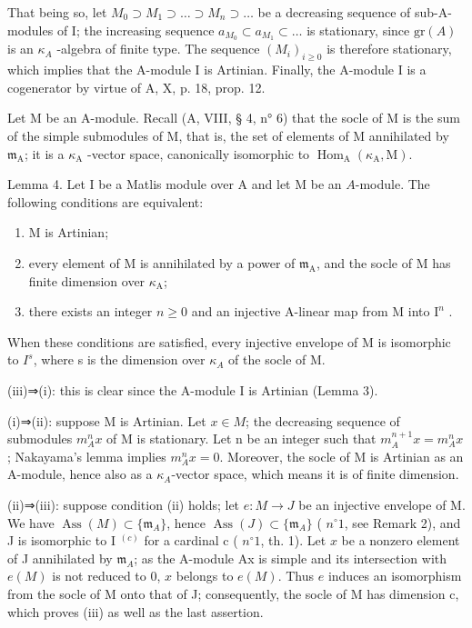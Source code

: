 That being so, let \(M_{0} \supset M_{1} \supset \ldots \supset M_{n} \supset \ldots\) be a decreasing sequence of sub-A-modules of I; the increasing sequence \(a_{M_{0}} \subset a_{M_{1}} \subset \ldots\) is stationary, since \(\text{gr}(A)\) is an \(\kappa_{A}\) -algebra of finite type. The sequence \((M_{i})_{i \geqslant 0}\) is therefore stationary, which implies that the A-module I is Artinian. Finally, the A-module I is a cogenerator by virtue of A, X, p. 18, prop. 12.

Let M be an A-module. Recall (A, VIII, § 4, n° 6) that the socle of M is the sum of the simple submodules of M, that is, the set of elements of M annihilated by \(\mathfrak{m}_{\mathrm{A}}\); it is a \(\kappa_{\mathrm{A}}\) -vector space, canonically isomorphic to \(\operatorname{Hom}_{\mathrm{A}}(\kappa_{\mathrm{A}}, \mathrm{M})\).

Lemma 4. Let I be a Matlis module over A and let M be an \(A\)-module. The following conditions are equivalent:

\begin{enumerate}
\def\labelenumi{(\roman{enumi})}
\item
  M is Artinian;
\item
  every element of M is annihilated by a power of \(\mathfrak{m}_{\mathrm{A}}\), and the socle of M has finite dimension over \(\kappa_{\mathrm{A}}\);
\item
  there exists an integer \(n \geqslant 0\) and an injective A-linear map from M into \(\mathrm{I}^n\) .
\end{enumerate}

When these conditions are satisfied, every injective envelope of M is isomorphic to \(I^{s}\), where s is the dimension over \(\kappa_{A}\) of the socle of M.

(iii)⇒(i): this is clear since the A-module I is Artinian (Lemma 3).

(i)⇒(ii): suppose M is Artinian. Let \(x \in M\); the decreasing sequence of submodules \(m_{A}^{n}x\) of M is stationary. Let n be an integer such that \(m_{A}^{n+1}x = m_{A}^{n}x\); Nakayama's lemma implies \(m_{A}^{n}x = 0\). Moreover, the socle of M is Artinian as an A-module, hence also as a \(\kappa_{A}\)-vector space, which means it is of finite dimension.

(ii)⇒(iii): suppose condition (ii) holds; let \(e:M\to J\) be an injective envelope of M. We have \(\operatorname{Ass}(M)\subset\{\mathfrak{m}_{A}\}\), hence \(\operatorname{Ass}(J)\subset\{\mathfrak{m}_{A}\}\) ( \(n^{\circ} 1\), see Remark 2), and J is isomorphic to I \(^{(c)}\) for a cardinal c ( \(n^{\circ} 1\), th. 1). Let \(x\) be a nonzero element of J annihilated by \(\mathfrak{m}_{A}\); as the A-module Ax is simple and its intersection with \(e(M)\) is not reduced to 0, \(x\) belongs to \(e(M)\). Thus \(e\) induces an isomorphism from the socle of M onto that of J; consequently, the socle of M has dimension c, which proves (iii) as well as the last assertion.

